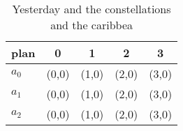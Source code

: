 \documentclass[a4paper]{article}
\begin{document}
\begin{table}
\begin{adjustbox}{width=0.5\columnwidth}
\begin{tabular}{|l|l|l|l|l|}
\hline
\textbf{plan} & \multicolumn{1}{c|}{\textbf{0}} & \multicolumn{1}{c|}{\textbf{1}} & \multicolumn{1}{c|}{\textbf{2}} & \multicolumn{1}{c|}{\textbf{3}} \\ \hline
\textbf{$a_0$}  & (0,0) & (1,0) & (2,0) & (3,0) \\ \hline
\textbf{$a_1$}  & (0,0) & (1,0) & (2,0) & (3,0) \\ \hline
\textbf{$a_2$}  & (0,0) & (1,0) & (2,0) & (3,0) \\ \hline
\end{tabular}
\end{adjustbox}
\caption{Yesterday and the constellations and the caribbea
}
\end{table}
\end{document}
